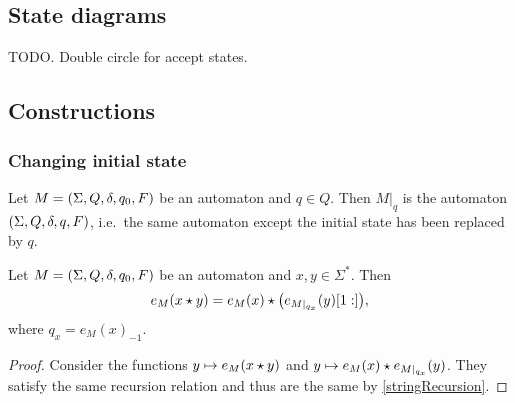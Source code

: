 \subsection{State diagrams}
TODO. Double circle for accept states.

\subsection{Constructions}
\subsubsection{Changing initial state}
\begin{definition}
Let $M = \left( \Sigma, Q, \delta, q_{0}, F \right)$ be an automaton and $q\in Q$. Then $M|_{q}$ is the automaton $\left( \Sigma, Q, \delta, q, F \right)$, i.e.\ the same automaton except the initial state has been replaced by $q$.
\end{definition}

\begin{lemma} \label{automatonRunFactorisation}
Let $M = \left( \Sigma, Q, \delta, q_{0}, F \right)$ be an automaton and $x,y\in \Sigma^*$. Then
\[ e_M(x \star y) = e_M(x)\star \big(e_{M|_{q_x}}(y)[1:]\big), \]
where $q_x = e_M(x)_{-1}$.
\end{lemma}
\begin{proof}
Consider the functions $y\mapsto e_M(x \star y)$ and $y\mapsto e_M(x)\star e_{M|_{q_x}}(y)$. They satisfy the same recursion relation and thus are the same by \ref{stringRecursion}.
\end{proof}

